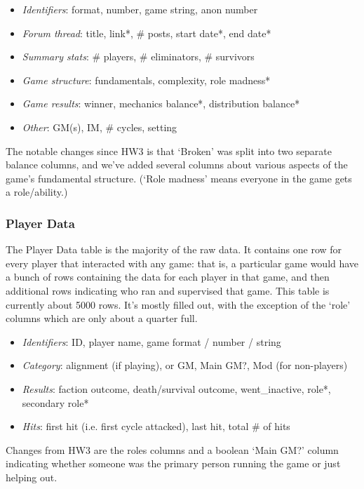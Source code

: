\documentclass[11pt, oneside]{amsart}   	%
\begin{document}
\begin{itemize}
    \item \textit{Identifiers}: format, number, game string, anon number
    \item \textit{Forum thread}: title, link*, \# posts, start date*, end date*
    \item \textit{Summary stats}: \# players, \# eliminators, \# survivors
    \item \textit{Game structure}: fundamentals, complexity, role madness*
    \item \textit{Game results}: winner, mechanics balance*, distribution balance*
    \item \textit{Other}: GM(s), IM, \# cycles, setting
\end{itemize}

The notable changes since HW3 is that `Broken' was split into two separate balance columns, and we've added several columns about various aspects of the game's fundamental structure. (`Role madness' means everyone in the game gets a role/ability.)

\subsubsection{Player Data}
The Player Data table is the majority of the raw data. It contains one row for every player that interacted with any game: that is, a particular game would have a bunch of rows containing the data for each player in that game, and then additional rows indicating who ran and supervised that game. This table is currently about 5000 rows. It's mostly filled out, with the exception of the `role' columns which are only about a quarter full. 

\begin{itemize}
    \item \textit{Identifiers}: ID, player name, game format / number / string 
    \item \textit{Category}: alignment (if playing), or GM, Main GM?, Mod (for non-players)
    \item \textit{Results}: faction outcome, death/survival outcome, went\_inactive, role*, secondary role*
    \item \textit{Hits}: first hit (i.e. first cycle attacked), last hit, total \# of hits
\end{itemize}

Changes from HW3 are the roles columns and a boolean `Main GM?' column indicating whether someone was the primary person running the game or just helping out. 
\end{document}
